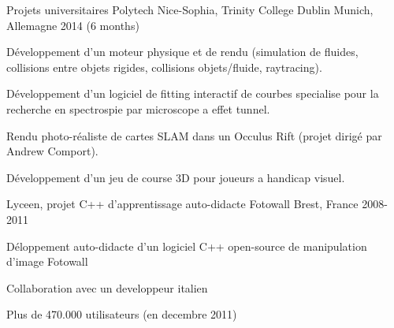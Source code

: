 \begin{cventries}
  \cventry
    {Projets universitaires} %
    {Polytech Nice-Sophia, Trinity College Dublin} %
    {Munich, Allemagne} %
    {2014 (6 months)} %
    {
      \begin{cvitems} %
        \item Développement d'un moteur physique et de rendu (simulation de fluides, collisions entre objets rigides, collisions objets/fluide, raytracing).
        \item Développement d'un logiciel de fitting interactif de courbes specialise pour la recherche en spectrospie par microscope a effet tunnel. 
        \item Rendu photo-réaliste de cartes SLAM dans un Occulus Rift (projet dirigé par Andrew Comport).
        \item Développement d'un jeu de course 3D pour joueurs a handicap visuel. 
      \end{cvitems}
    }

  \cventry
    {Lyceen, projet C++ d'apprentissage auto-didacte} %
    {Fotowall} %
    {Brest, France} %
    {2008-2011} %
    {
      \begin{cvitems} %
        \item Déloppement auto-didacte d'un logiciel C++ open-source de manipulation d'image Fotowall
        \item Collaboration avec un developpeur italien
        \item Plus de 470.000 utilisateurs (en decembre 2011)
      \end{cvitems}
    }

\end{cventries}
